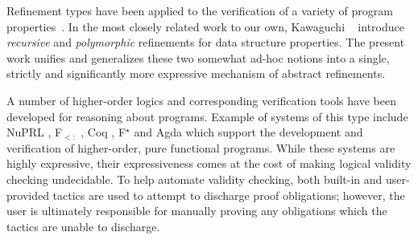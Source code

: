 Refinement types have been applied to the verification of a variety of
program properties~\cite{pfenningxi98,Dunfield,GordonTOPLAS2011,FournetCCS11}.
%
In the most closely related work to our own, Kawaguchi \etal~\cite{LiquidPLDI09} 
introduce \emph{recursive} and \emph{polymorphic} refinements for data
structure properties.
%
The present work unifies and generalizes these two somewhat ad-hoc notions 
into a single, strictly and significantly more expressive mechanism of
abstract refinements.

A number of higher-order logics and corresponding verification tools
have been developed for reasoning about programs.
%
Example of systems of this type include NuPRL \cite{Constable86},
F$_{<:}$ \cite{Cardelli91},
Coq \cite{coq-book}, F$^\star$ \cite{SwamyCFSBY11} and Agda \cite{norell07}
which support the development and verification of higher-order, 
pure functional programs.
%
While these systems are highly expressive, their expressiveness comes at the
cost of making logical validity checking undecidable.
%
To help automate validity checking, both built-in and user-provided
tactics are used to attempt to discharge proof obligations; however,
the user is ultimately responsible for manually proving any
obligations which the tactics are unable to discharge.
